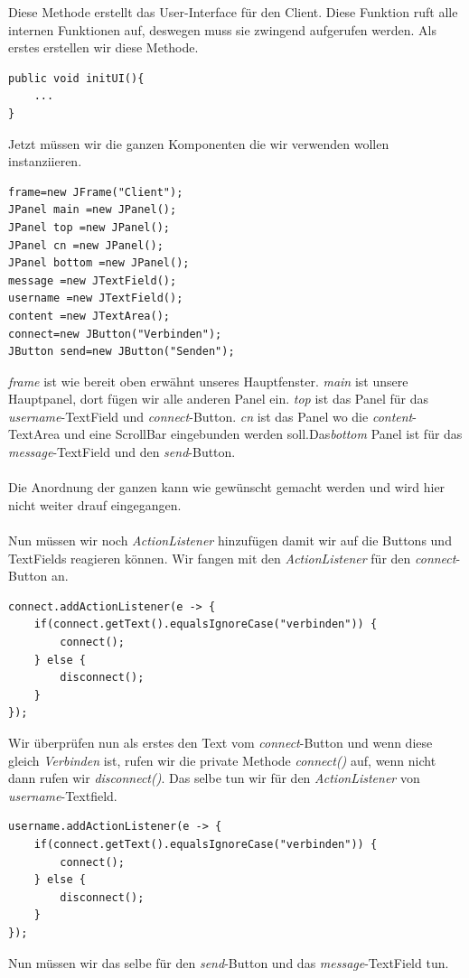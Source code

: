 Diese Methode erstellt das User-Interface für den Client. Diese Funktion ruft alle internen Funktionen auf, deswegen muss sie zwingend aufgerufen werden. Als erstes erstellen wir diese Methode.
\begin{lstlisting}
public void initUI(){
	...
}
\end{lstlisting}
Jetzt müssen wir die ganzen Komponenten die wir verwenden wollen instanziieren.
\begin{lstlisting}
frame=new JFrame("Client");
JPanel main =new JPanel();
JPanel top =new JPanel();
JPanel cn =new JPanel();
JPanel bottom =new JPanel();
message =new JTextField();
username =new JTextField();
content =new JTextArea();
connect=new JButton("Verbinden");
JButton send=new JButton("Senden");
\end{lstlisting}
\textit{frame} ist wie bereit oben erwähnt unseres Hauptfenster. \textit{main} ist unsere Hauptpanel, dort fügen wir alle anderen Panel ein. \textit{top} ist das Panel für das \textit{username}-TextField und \textit{connect}-Button. \textit{cn} ist das Panel wo die \textit{content}-TextArea und eine ScrollBar eingebunden werden soll.Das\textit{bottom} Panel ist für das \textit{message}-TextField und den \textit{send}-Button.\\\\Die Anordnung der ganzen kann wie gewünscht gemacht werden und wird hier nicht weiter drauf eingegangen.\\\\Nun müssen wir noch \textit{ActionListener} hinzufügen damit wir auf die Buttons und TextFields reagieren können. Wir fangen mit den \textit{ActionListener} für den \textit{connect}-Button an.
\begin{lstlisting}
connect.addActionListener(e -> {
	if(connect.getText().equalsIgnoreCase("verbinden")) {
		connect();
	} else {
		disconnect();
	}
});
\end{lstlisting}
Wir überprüfen nun als erstes den Text vom \textit{connect}-Button und wenn diese gleich \textit{Verbinden} ist, rufen wir die private Methode \textit{connect()} auf, wenn nicht dann rufen wir \textit{disconnect()}. Das selbe tun wir für den \textit{ActionListener} von \textit{username}-Textfield.
\begin{lstlisting}
username.addActionListener(e -> {
	if(connect.getText().equalsIgnoreCase("verbinden")) {
		connect();
	} else {
		disconnect();
	}
});
\end{lstlisting}
Nun müssen wir das selbe für den \textit{send}-Button und das \textit{message}-TextField tun.
